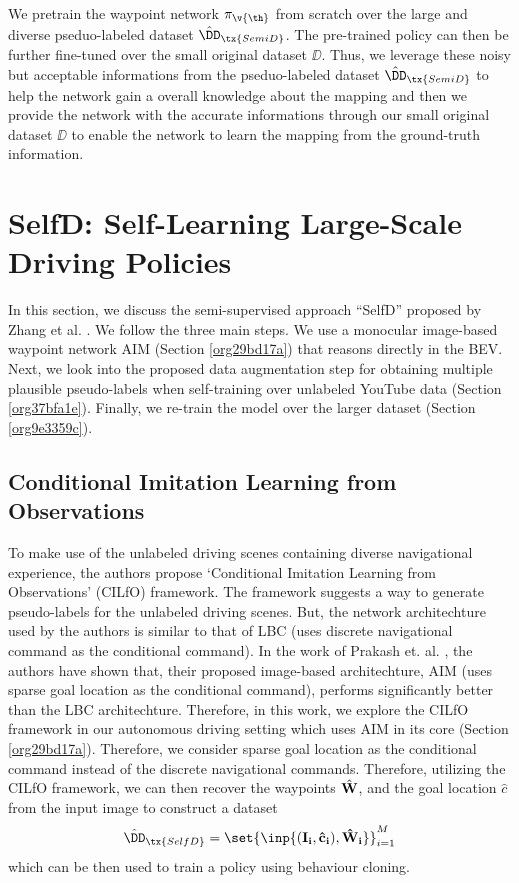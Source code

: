 \documentclass[letterpaper, 12pt]{book}
\theoremstyle{definition}
\theoremstyle{definition}
\theoremstyle{definition}
\theoremstyle{definition}
\theoremstyle{definition}
\newcommand{\vth}{\v{\th}}
\begin{document}
We pretrain the waypoint network \(\pi_{\vth}\) from scratch over the large and
diverse pseduo-labeled dataset \(\hat{\DD}_{\tx{SemiD}}\). The pre-trained policy
can then be further fine-tuned over the small original dataset \(\DD\). Thus, we
leverage these noisy but acceptable informations from the pseduo-labeled dataset
\(\hat{\DD}_{\tx{SemiD}}\) to help the network gain a overall knowledge about the
mapping and then we provide the network with the accurate informations through
our small original dataset \(\DD\) to enable the network to learn the mapping
from the ground-truth information.

\section{SelfD: Self-Learning Large-Scale Driving Policies}
\label{sec:orgfa7c7a2}
In this section, we discuss the semi-supervised approach ``SelfD'' proposed
by Zhang et al. \cite{Zhang2022a}. We follow the three main steps. We use a
monocular image-based waypoint network AIM (Section \ref{org29bd17a}) that reasons
directly in the BEV. Next, we look into the proposed data augmentation step
for obtaining multiple plausible pseudo-labels when self-training over
unlabeled YouTube data (Section \ref{org37bfa1e}). Finally, we re-train the model
over the larger dataset (Section \ref{org9e3359c}).

\subsection{Conditional Imitation Learning from Observations}
\label{sec:org8e76397}
To make use of the unlabeled driving scenes containing diverse navigational
experience, the authors propose `Conditional Imitation Learning from
Observations' (CILfO) \cite{Zhang2022a} framework. The framework suggests a way
to generate pseudo-labels for the unlabeled driving scenes. But, the network
architechture used by the authors is similar to that of LBC \cite{Chen2019}
(uses discrete navigational command as the conditional command). In the work of
Prakash et. al. \cite{Prakash2021}, the authors have shown that, their proposed
image-based architechture, AIM (uses sparse goal location as the conditional
command), performs significantly better than the LBC architechture. Therefore,
in this work, we explore the CILfO framework in our autonomous driving setting
which uses AIM in its core (Section \ref{org29bd17a}). Therefore, we consider sparse goal
location as the conditional command instead of the discrete navigational
commands. Therefore, utilizing the CILfO framework, we can then recover the
waypoints \(\hat{\bf W}\), and the goal location \(\hat{c}\) from the input
image to construct a dataset \[\hat{\DD}_{\tx{SelfD}}=\set{\inp{(\bf I_{i}, \hat
c_{i}), \hat{\bf W}_{i}}}_{i=1}^{M}\] which can be then used to train a policy
using behaviour cloning.
\end{document}
